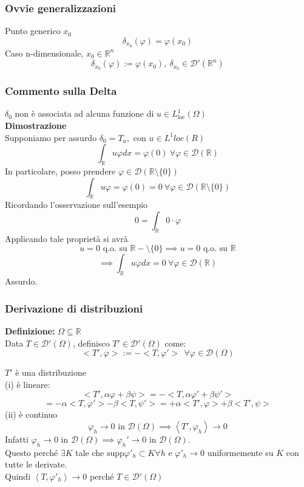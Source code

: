 \documentclass[a4paper]{article}
\newcommand{\R}{\mathbb{R}}
\begin{document}
\subsubsection{Ovvie generalizzazioni}
Punto generico $x_0$
\[\delta_{x_0}(\varphi)=\varphi(x_0)\]
Caso n-dimensionale, $x_0\in \R^n$
\[\delta_{x_0}(\varphi):=\varphi(x_0),\ \delta_{x_0}\in \mathcal D'(\R^n)\]
\subsubsection{Commento sulla Delta}
$\delta_0$ non è associata ad alcuna funzione di $u\in L^1_{\text{loc}}(\Omega)$
\\\textbf{Dimostrazione} 
\\Supponiamo per assurdo $\delta_0=T_u,$ con $u\in L^1loc(R)$
\[\int_{\R}^{} u\varphi dx=\varphi(0)\ \forall \varphi \in \mathcal D(\R)\]
In particolare, posso prendere $\varphi \in \mathcal D(\R \setminus \{0\} )$ 
\[\int_{\R}^{} u\varphi=\varphi(0)=0\ \forall \varphi\in\mathcal D(\R\setminus \{ 0\} )\]
Ricordando l'osservazione sull'esempio 
\[0=\int_{\R}^{} 0\cdot \varphi\]
Applicando tale proprietà si avrà
\[u=0\text{ q.o. su }\R-\setminus \{ 0\} \implies u=0\text{ q.o. su }\R\]
\[\implies \int_{\R}^{} u\varphi dx=0\ \forall \varphi \in \mathcal D(\R)\]
Assurdo.
\subsubsection{Derivazione di distribuzioni}
\begin{tcolorbox}
\textbf{Definizione: }$\Omega \subseteq  \R$
\\Data $T\in \mathcal D'(\Omega)$, definisco $T' \in \mathcal D'(\Omega)$ come:
\[<T', \varphi>:=- <T,\varphi'>\ \ \forall \varphi \in \mathcal D(\Omega)\]

\end{tcolorbox}
$T'$ è una distribuzione
\\(i) è lineare:
\[<T',\alpha\varphi +\beta\psi> = -<T,\alpha \varphi'+\beta\psi '>\] \[= -\alpha <T,\varphi'>-\beta<T,\psi'> = +\alpha <T',\varphi>+\beta<T',\psi>\]
(ii) è continuo
\[\varphi_h\to 0\text{ in }\mathcal D(\Omega)\implies \left<T',\varphi_h \right>\to 0\]
Infatti $\varphi_h\to 0\text{ in }\mathcal D(\Omega)\implies\varphi_h'\to 0\text{ in }\mathcal D(\Omega)$.
\\Questo perché $\exists K$ tale che $\text{supp}\varphi'_h\subset K\forall h$ e $\varphi'_h\to 0$ uniformemente su $K$ con tutte le derivate.
\\Quindi $\left<T,\varphi'_h \right>\to 0$ perché $T\in \mathcal D'(\Omega)$
\end{document}
